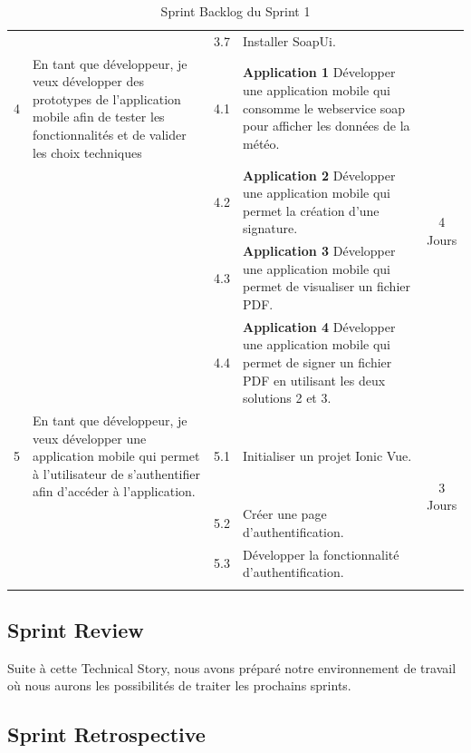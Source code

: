 \begin{adjustwidth}{-1cm}{}
\begin{longtable}{|c|p{6cm}|c|p{6cm}|c|}
    \cline{3-4}
    &  &  3.7 &Installer SoapUi.&\\
    \cline{1-5}
    4 & En tant que développeur, je veux développer des prototypes de l'application mobile afin de tester les fonctionnalités et de valider les choix techniques &  4.1 &\textbf{Application 1} Développer une application mobile qui consomme le webservice soap pour afficher les données de la météo.&\multirow{4}{2cm}{4 Jours}\\
    \cline{3-4}
    &  &  4.2 &\textbf{Application 2} Développer une application mobile qui permet la création d'une signature.&\\
    \cline{3-4}
    &  &  4.3 &\textbf{Application 3} Développer une application mobile qui permet de visualiser un fichier PDF.&\\
    \cline{3-4}
    &  &  4.4 &\textbf{Application 4} Développer une application mobile qui permet de signer un fichier PDF en utilisant les deux solutions 2 et 3.&\\
    \cline{1-5}
    5 & En tant que développeur, je veux développer une application mobile qui permet à l'utilisateur de s'authentifier afin d'accéder à l'application. & 
    
    5.1 &Initialiser un projet Ionic Vue.&\multirow{3}{2cm}{3 Jours}\\
    \cline{3-4}
    &  &  5.2 & Créer une page d'authentification.&\\
    \cline{3-4}
    &  &  5.3 & Développer la fonctionnalité d'authentification.&\\

  \hline

  \caption{Sprint Backlog du Sprint 1}
  \label{tab:sprint-backlog-1}
\end{longtable}
\end{adjustwidth}
\subsection{Sprint Review}
Suite à cette Technical Story, nous avons préparé notre environnement de travail où nous aurons les possibilités de traiter les prochains sprints.

\subsection{Sprint Retrospective}

